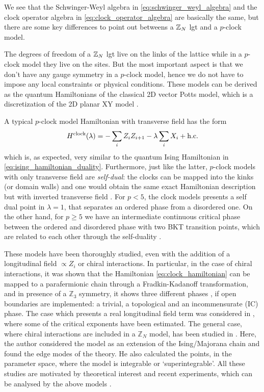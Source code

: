 We see that the Schwinger-Weyl algebra in \eqref{eq:schwinger_weyl_algebra} and the clock operator algebra in \eqref{eq:clock_operator_algebra} are basically the same, but there are some key differences to point out betweens a $\mathbb{Z}_N$ \ac{lgt} and a $p$-clock model.

The degrees of freedom of a $\mathbb{Z}_N$ \ac{lgt} live on the links of the lattice while in a $p$-clock model they live on the sites.
But the most important aspect is that we don't have any gauge symmetry in a $p$-clock model, hence we do not have to impose any local constraints or physical conditions.
These models can be derived as the quantum Hamiltonians of the classical 2D vector Potts model, which is a discretization of the 2D planar XY model \cite{ortiz2012dualities}.

A typical $p$-clock model Hamiltonian with transverse field has the form
\begin{equation}
    H^{\text{clock}}(\lambda) = - \sum_{i} Z_i Z_{i+1} - \lambda \sum_{i} X_i + \text{h.c.}
    \label{eq:clock_hamiltonian}
\end{equation}
which is, as expected, very similar to the quantum Ising Hamiltonian in \eqref{eq:ising_hamiltonian_duality}.
Furthermore, just like the latter, $p$-clock models with only transverse field are \emph{self-dual}:
the clocks can be mapped into the kinks (or domain walls) and one would obtain the same exact Hamiltonian description but with inverted transverse field \cite{ortiz2012dualities}.
For $p < 5$, the clock models presents a self dual point in $\lambda = 1$, that separates an ordered phase from a disordered one.
On the other hand, for $p \geq 5$ we have an intermediate continuous critical phase between the ordered and disordered phase with two BKT transition points, which are related to each other through the self-duality \cite{sun2019phase}.

These models have been thoroughly studied, even with the addition of a longitudinal field $\propto Z_i$ \cite{baxter1982exactlysm} or chiral interactions.
In particular, in the case of chiral interactions, it was shown \cite{fendley2012parafermions} that the Hamiltonian \eqref{eq:clock_hamiltonian} can be mapped to a parafermionic chain through a Fradkin-Kadanoff transformation, and in presence of a $\mathbb{Z}_3$ symmetry, it shows three different phases \cite{zhuang2015clock}, if open boundaries are implemented: a trivial, a topological and an incommensurate (IC) phase.
The case which presents a real longitudinal field term was considered in \cite{huang2019clock},  where some of the critical exponents have been estimated.
The general case, where chiral interactions are included in a $\mathbb{Z}_N$ model, has been studied in \cite{fendley2012parafermions}.
Here, the author considered the model as an extension of the Ising/Majorana chain and found the edge modes of the theory.
He also calculated the points, in the parameter space, where the model is integrable or `superintegrable'.
All these studies are motivated by theoretical interest and recent experiments, which can be analysed by the above models \cite{bernien2017probing}.


